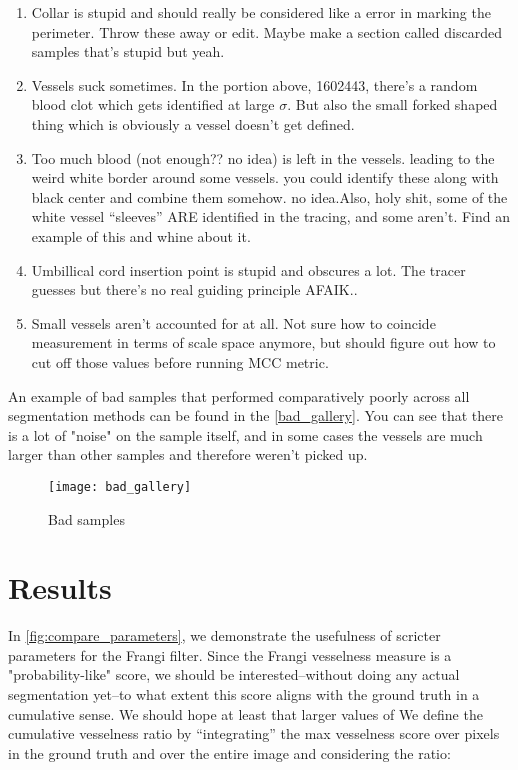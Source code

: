 \begin{enumerate}
\item Collar is stupid and should really be considered like a error in marking the perimeter. Throw these away or edit. Maybe make a section called discarded samples that's stupid but yeah.
\item Vessels suck sometimes. In the portion above, 1602443, there's a random blood clot which gets identified at large $\sigma$. But also the small forked shaped thing which is obviously a vessel doesn't get defined.
\item Too much blood (not enough?? no idea) is left in the vessels. leading to the weird white border around some vessels. you could identify these along with black center and combine them somehow. no idea.Also, holy shit, some of the white vessel ``sleeves'' ARE identified in the tracing, and some aren't. Find an example of this and whine about it.
\item Umbillical cord insertion point is stupid and obscures a lot. The tracer guesses but there's no real guiding principle AFAIK..
\item Small vessels aren't accounted for at all. Not sure how to coincide measurement in terms of scale space anymore, but should figure out how to cut off those values before running MCC metric.
\end{enumerate}

An example of bad samples that performed comparatively poorly across all segmentation methods can be found in the \cref{bad_gallery}. You can see that there is a lot of "noise" on the sample itself, and in some cases the vessels are much larger than other samples and therefore weren't picked up.

\begin{figure}[p]
	\texttt{[image: bad\_gallery]}
	\caption{Bad samples}
	\label{fig:bad-gallery}
\end{figure}

\section{Results}

In \cref{fig:compare_parameters}, we demonstrate the usefulness of scricter parameters for the Frangi filter. Since the Frangi vesselness measure is a "probability-like" score, we should be interested--without doing any actual segmentation yet--to what extent this score aligns with the ground truth in a cumulative sense. We should hope at least that larger values of We define the cumulative vesselness ratio by ``integrating'' the max vesselness score over pixels in the ground truth and over the entire image and considering the ratio:

